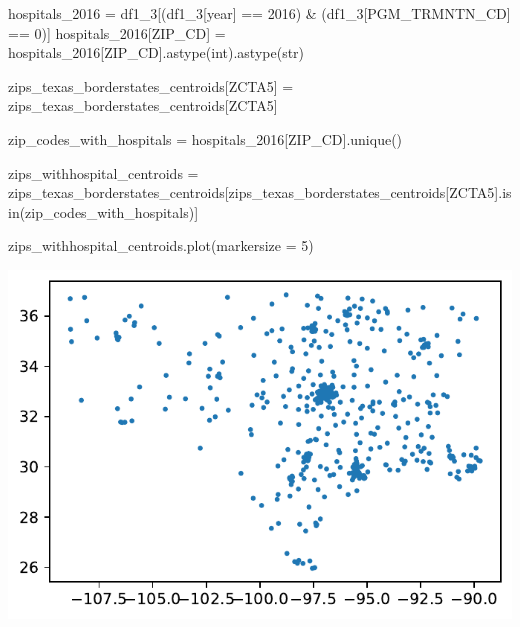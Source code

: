 \documentclass[
  letterpaper,
  DIV=11,
  numbers=noendperiod]{scrartcl}
\newenvironment{Shaded}{\begin{snugshade}}{\end{snugshade}}
\newcommand{\BuiltInTok}[1]{\textcolor[rgb]{0.00,0.23,0.31}{#1}}
\newcommand{\DecValTok}[1]{\textcolor[rgb]{0.68,0.00,0.00}{#1}}
\newcommand{\NormalTok}[1]{\textcolor[rgb]{0.00,0.23,0.31}{#1}}
\newcommand{\OperatorTok}[1]{\textcolor[rgb]{0.37,0.37,0.37}{#1}}
\newcommand{\StringTok}[1]{\textcolor[rgb]{0.13,0.47,0.30}{#1}}
\begin{document}
\begin{Shaded}
\begin{Highlighting}[]
\NormalTok{hospitals\_2016 }\OperatorTok{=}\NormalTok{ df1\_3[(df1\_3[}\StringTok{\textquotesingle{}year\textquotesingle{}}\NormalTok{] }\OperatorTok{==} \DecValTok{2016}\NormalTok{) }\OperatorTok{\&}\NormalTok{ (df1\_3[}\StringTok{\textquotesingle{}PGM\_TRMNTN\_CD\textquotesingle{}}\NormalTok{] }\OperatorTok{==} \DecValTok{0}\NormalTok{)]}
\NormalTok{hospitals\_2016[}\StringTok{\textquotesingle{}ZIP\_CD\textquotesingle{}}\NormalTok{] }\OperatorTok{=}\NormalTok{ hospitals\_2016[}\StringTok{\textquotesingle{}ZIP\_CD\textquotesingle{}}\NormalTok{].astype(}\BuiltInTok{int}\NormalTok{).astype(}\BuiltInTok{str}\NormalTok{)}

\NormalTok{zips\_texas\_borderstates\_centroids[}\StringTok{\textquotesingle{}ZCTA5\textquotesingle{}}\NormalTok{] }\OperatorTok{=}\NormalTok{ zips\_texas\_borderstates\_centroids[}\StringTok{\textquotesingle{}ZCTA5\textquotesingle{}}\NormalTok{]}

\NormalTok{zip\_codes\_with\_hospitals }\OperatorTok{=}\NormalTok{ hospitals\_2016[}\StringTok{\textquotesingle{}ZIP\_CD\textquotesingle{}}\NormalTok{].unique()}

\NormalTok{zips\_withhospital\_centroids }\OperatorTok{=}\NormalTok{ zips\_texas\_borderstates\_centroids[zips\_texas\_borderstates\_centroids[}\StringTok{\textquotesingle{}ZCTA5\textquotesingle{}}\NormalTok{].isin(zip\_codes\_with\_hospitals)]}

\NormalTok{zips\_withhospital\_centroids.plot(markersize }\OperatorTok{=} \DecValTok{5}\NormalTok{)}
\end{Highlighting}
\end{Shaded}

\includegraphics{ps4_files/figure-pdf/cell-23-output-1.pdf}
\end{document}
